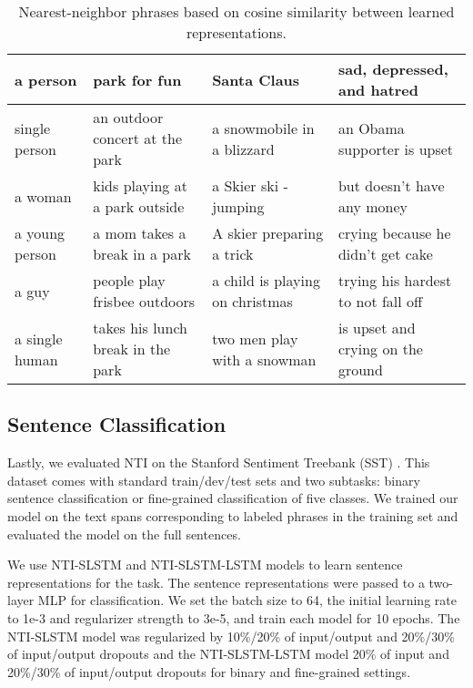 \documentclass[11pt]{article}
\begin{document}
\begin{table*}[t]
\begin{center}
\hspace*{-0.6cm}
\small
\begin{tabular}{l|l|l|l}
\hline 
\bf a person & \bf park for fun & \bf Santa Claus & \bf sad, depressed, and hatred  \\
\hline
\multicolumn{1}{l|}{single person} & \multicolumn{1}{|l|}{an outdoor concert at the park} & \multicolumn{1}{|l|}{a snowmobile in a blizzard} & \multicolumn{1}{|l}{an Obama supporter is upset} \\
\multicolumn{1}{l|}{a woman} & \multicolumn{1}{|l|}{kids playing at a park outside} & \multicolumn{1}{|l|}{a Skier ski - jumping } & \multicolumn{1}{|l}{but doesn't have any money} \\
\multicolumn{1}{l|}{a young person} & \multicolumn{1}{|l|}{a mom takes a break in a park} & \multicolumn{1}{|l|}{A skier preparing a trick} & \multicolumn{1}{|l}{crying because he didn't get cake} \\
\multicolumn{1}{l|}{a guy} & \multicolumn{1}{|l|}{people play frisbee outdoors} & \multicolumn{1}{|l|}{a child is playing on christmas} & \multicolumn{1}{|l}{trying his hardest to not fall off} \\
\multicolumn{1}{l|}{a single human} & \multicolumn{1}{|l|}{takes his lunch break in the park} & \multicolumn{1}{|l|}{two men play with a snowman} & \multicolumn{1}{|l}{is upset and crying on the ground} \\
\hline
\end{tabular}
\end{center}
\caption{\label{table:phrase}Nearest-neighbor phrases based on cosine similarity between learned representations.}
\end{table*}

\subsection{Sentence Classification}

Lastly, we evaluated NTI on the Stanford Sentiment Treebank (SST) \cite{socher2013recursive}. This dataset comes with standard train/dev/test sets and two subtasks: binary sentence classification or fine-grained classification of five classes. We trained our model on the text spans corresponding to labeled phrases in the training set and evaluated the model on the full sentences.

We use NTI-SLSTM and NTI-SLSTM-LSTM models to learn sentence representations for the task. The sentence representations were passed to a two-layer MLP for classification. 
We set the batch size to 64, the initial learning rate to 1e-3 and  regularizer strength to 3e-5, and train each model for 10 epochs. The NTI-SLSTM model was regularized by 10\%/20\% of input/output and 20\%/30\% of input/output dropouts and the NTI-SLSTM-LSTM model 20\% of input and 20\%/30\% of input/output dropouts for binary and fine-grained settings.
\end{document}
